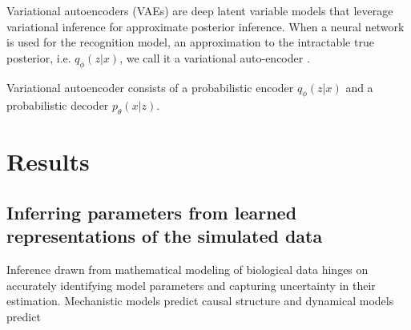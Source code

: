 \documentclass[12pt]{article} %
\begin{document}
Variational autoencoders (VAEs) are deep latent variable models that leverage variational inference for approximate posterior inference. When a neural network is used for the recognition model, an approximation to the intractable true posterior, i.e. $q_{\phi}(z|x)$, we call it a variational auto-encoder \citep{kingma2013auto}. 

Variational autoencoder consists of a probabilistic encoder $q_{\phi}(z|x)$ and a probabilistic decoder $p_{\theta}(x|z)$. 







\section*{Results}
\subsection*{Inferring parameters from learned representations of the simulated data}

Inference drawn from mathematical modeling of biological data hinges on accurately identifying model parameters and capturing uncertainty in their estimation.
Mechanistic models predict causal structure and dynamical models predict
\end{document}
